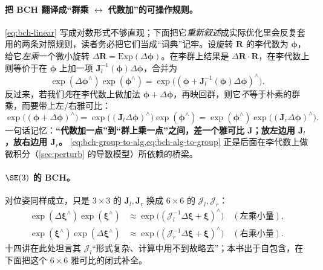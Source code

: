 \paragraph{把 BCH 翻译成“群乘 $\leftrightarrow$ 代数加”的可操作规则。}\cref{eq:bch-linear} 写成对数形式不够直观；下面把它\emph{重新叙述}成实际优化里会反复套用的两条对照规则\cite{gaoxiang2019slam14}，读者务必把它们当成“词典”记牢。设旋转 $\mathbf{R}$ 的李代数为 $\boldsymbol{\phi}$，给它\emph{左乘}一个微小旋转 $\Delta\mathbf{R}=\mathrm{Exp}(\Delta\boldsymbol{\phi})$。在李群上结果是 $\Delta\mathbf{R}\cdot\mathbf{R}$，在李代数上则等价于在 $\boldsymbol{\phi}$ 上加一项 $\mathbf{J}_l^{-1}(\boldsymbol{\phi})\Delta\boldsymbol{\phi}$，合并为
\begin{equation}
  \exp(\Delta\boldsymbol{\phi}^\wedge)\exp(\boldsymbol{\phi}^\wedge)=\exp\!\big((\boldsymbol{\phi}+\mathbf{J}_l^{-1}(\boldsymbol{\phi})\Delta\boldsymbol{\phi})^\wedge\big).
  \label{eq:bch-group-to-alg}
\end{equation}
反过来，若我们\emph{先}在李代数上做加法 $\boldsymbol{\phi}+\Delta\boldsymbol{\phi}$，再映回群，则它\emph{不}等于朴素的群乘，而要带上左/右雅可比：
\begin{equation}
  \exp\!\big((\boldsymbol{\phi}+\Delta\boldsymbol{\phi})^\wedge\big)=\exp\!\big((\mathbf{J}_l\Delta\boldsymbol{\phi})^\wedge\big)\exp(\boldsymbol{\phi}^\wedge)=\exp(\boldsymbol{\phi}^\wedge)\exp\!\big((\mathbf{J}_r\Delta\boldsymbol{\phi})^\wedge\big).
  \label{eq:bch-alg-to-group}
\end{equation}
一句话记忆：\textbf{“代数加一点”到“群上乘一点”之间，差一个雅可比 $\mathbf{J}$；放左边用 $\mathbf{J}_l$，放右边用 $\mathbf{J}_r$。} \cref{eq:bch-group-to-alg,eq:bch-alg-to-group} 正是后面在李代数上做微积分（\cref{sec:perturb} 的导数模型）所依赖的桥梁。

\paragraph{$\SE(3)$ 的 BCH。}对位姿同样成立，只是 $3\times3$ 的 $\mathbf{J}_l,\mathbf{J}_r$ 换成 $6\times6$ 的 $\boldsymbol{\mathcal{J}}_l,\boldsymbol{\mathcal{J}}_r$：
\begin{align}
  \exp(\Delta\boldsymbol{\xi}^\wedge)\exp(\boldsymbol{\xi}^\wedge)&\approx\exp\!\big((\boldsymbol{\mathcal{J}}_l^{-1}\Delta\boldsymbol{\xi}+\boldsymbol{\xi})^\wedge\big)\quad(\text{左乘小量}),\label{eq:bch-se3-left}\\
  \exp(\boldsymbol{\xi}^\wedge)\exp(\Delta\boldsymbol{\xi}^\wedge)&\approx\exp\!\big((\boldsymbol{\mathcal{J}}_r^{-1}\Delta\boldsymbol{\xi}+\boldsymbol{\xi})^\wedge\big)\quad(\text{右乘小量}).\label{eq:bch-se3-right}
\end{align}
十四讲在此处坦言其 $\boldsymbol{\mathcal{J}}_l$“形式复杂、计算中用不到故略去”；本书出于自包含，在下面把这个 $6\times6$ 雅可比的闭式补全。

